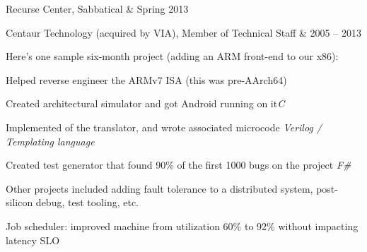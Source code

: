 \documentclass[letterpaper]{scrartcl}
\begin{document}
\begin{list1}
\item \begin{tabular1bold} Recurse Center, Sabbatical & Spring 2013 \end{tabular1bold}

\item \begin{tabular1bold} Centaur Technology (acquired by VIA), Member of Technical Staff & 2005 -- 2013 \end{tabular1bold}

  \begin{list2}

  \item Here's one sample six-month project (adding an ARM front-end to our x86):
    \begin{list3}
    \item Helped reverse engineer the ARMv7 ISA (this was pre-AArch64)
    \item Created architectural simulator and got Android running on it\hfill \emph{C}
    \item Implemented  of the translator, and wrote associated microcode \hfill \emph{Verilog / Templating language}
    \item Created test generator that found 90\% of the first 1000 bugs on the project \hfill \emph{F\#}
    \end{list3}

  \item Other projects included adding fault tolerance to a distributed system, post-silicon debug, test tooling, etc.

    \begin{list3}
    \item Job scheduler: improved machine from utilization 60\% to 92\% without impacting latency SLO
    \end{list3}

  \end{list2}


\end{list1}
\end{document}
